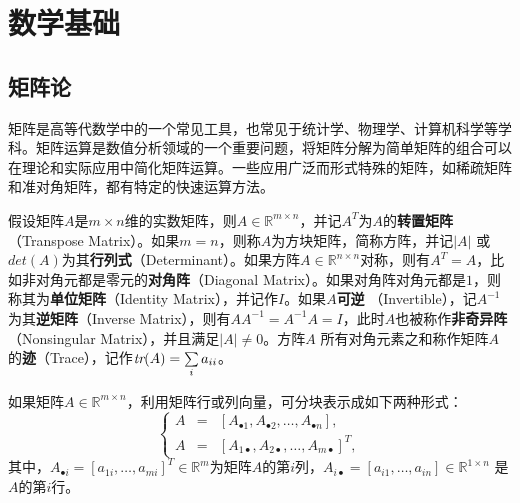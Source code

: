 \part{数学基础}
\chapter{矩阵论}
矩阵是高等代数学中的一个常见工具，也常见于统计学、物理学、计算机科学等学科。矩阵运算是数值分析领域的一个重要问题，将矩阵分解为简单矩阵的组合可以在理论和实际应用中简化矩阵运算。一些应用广泛而形式特殊的矩阵，如稀疏矩阵和准对角矩阵，都有特定的快速运算方法。

假设矩阵$A$是$m\times n$维的实数矩阵，则$A\in \mathbb R^{m\times n}$，并记$A^T$为$A$的\textbf{转置矩阵}（Transpose Matrix）。如果$m=n$，则称$A$为方块矩阵，简称方阵，并记$|A|$ 或$\textit{det}(A)$为其\textbf{行列式}（Determinant）。如果方阵$A\in \mathbb R^{n\times n}$对称，则有$A^T=A$，比如非对角元都是零元的\textbf{对角阵}（Diagonal Matrix）。如果对角阵对角元都是$1$，则称其为\textbf{单位矩阵}（Identity Matrix），并记作$I$。如果$A$\textbf{可逆}
（Invertible），记$A^{-1}$为其\textbf{逆矩阵}（Inverse Matrix），则有$AA^{-1} = A^{-1}A=I$，此时$A$也被称作\textbf{非奇异阵}（Nonsingular Matrix），并且满足$|A|\ne 0$。方阵$A$ 所有对角元素之和称作矩阵$A$ 的\textbf{迹}（Trace），记作$\operatorname{\textit{tr}}(A)=\sum\limits_i a_{ii}$。

\begin{definition}[分块矩阵]
如果矩阵$A\in \mathbb R^{m\times n}$，利用矩阵行或列向量，可分块表示成如下两种形式：
\[
    \left\{
        \begin{array}{rcl}
          A &=& [A_{\bullet 1}, A_{\bullet 2}, \ldots, A_{\bullet n}],\\
          A &=& [A_{1 \bullet}, A_{2 \bullet}, \ldots, A_{m \bullet}]^T,
        \end{array}
    \right.
\]
其中，$A_{\bullet i}=[a_{1i},\ldots,a_{mi}]^T \in \mathbb R^m$为矩阵$A$的第$i$列，$A_{i\bullet}=[a_{i1},\ldots,a_{in}]\in \mathbb R^{1\times n}$ 是$A$的第$i$行。
\end{definition}

